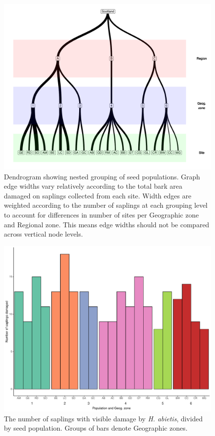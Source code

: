 \documentclass[a4paper, 11pt]{article}
\begin{document}
\begin{figure}
	\includegraphics[width=\textwidth]{dendro}
	\caption{Dendrogram showing nested grouping of seed populations. Graph edge widths vary relatively according to the total bark area damaged on saplings collected from each site. Width edges are weighted according to the number of saplings at each grouping level to account for differences in number of sites per Geographic zone and Regional zone. This means edge widths should not be compared across vertical node levels.}
\end{figure}

\begin{figure}
	\includegraphics[width=\textwidth]{barchart}
	\caption{The number of saplings with visible damage by \textit{H. abietis}, divided by seed population. Groups of bars denote Geographic zones.}
	\label{barchart}
\end{figure}
\end{document}
